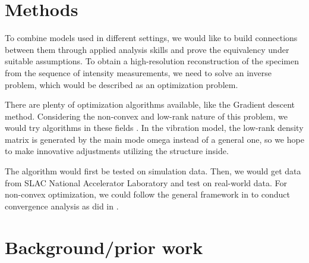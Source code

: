 \documentclass{article}
\numberwithin{equation}{section}
\begin{document}
\section{Methods}

To combine models used in different settings, we would like to build connections between them through applied analysis skills and prove the equivalency under suitable assumptions. To obtain a high-resolution reconstruction of the specimen from the sequence of intensity measurements, we need to solve an inverse problem, which would be described as an optimization problem. 

There are plenty of optimization algorithms available, like the Gradient descent method. Considering the non-convex and low-rank nature of this problem, we would try algorithms in these fields \cite{lowrank}\cite{ADMM}. In the vibration model, the low-rank density matrix is generated by the main mode omega instead of a general one, so we hope to make innovative adjustments utilizing the structure inside.

The algorithm would first be tested on simulation data. Then, we would get data from SLAC National Accelerator Laboratory and test on real-world data. For non-convex optimization, we could follow the general framework in \cite{nonconvex} to conduct convergence analysis as did in \cite{admm}.


\section{Background/prior work}
\end{document}
